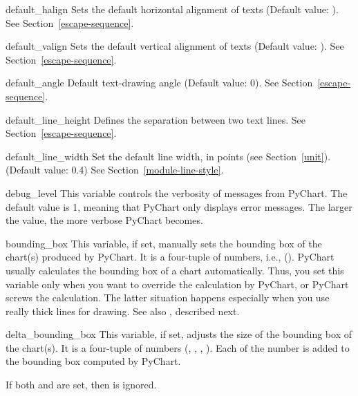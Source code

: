 \documentclass{howto}
\newcommand{\pychart}{PyChart}
\newcommand{\xref}[1]{See Section~\ref{#1}}
\newcommand{\pxref}[1]{see Section~\ref{#1}}
\begin{document}
\begin{datadesc}{default_halign}
Sets the default horizontal alignment of texts (Default value: ).
\xref{escape-sequence}.
\end{datadesc}

\begin{datadesc}{default_valign}
Sets the default vertical alignment of texts (Default value: ).
\xref{escape-sequence}.
\end{datadesc}

\begin{datadesc}{default_angle}
Default text-drawing angle (Default value: 0).
\xref{escape-sequence}.
\end{datadesc}

\begin{datadesc}{default_line_height}
Defines the separation between two text lines.
\xref{escape-sequence}.
\end{datadesc}

\begin{datadesc}{default_line_width}
Set the default line width, in points (\pxref{unit}). (Default value: 0.4)
\xref{module-line-style}.
\end{datadesc}

\begin{datadesc}{debug_level}
This variable controls the verbosity of messages from \pychart{}. The
default value is 1, meaning that \pychart{} only displays error
messages. The larger the value, the more verbose \pychart{} becomes.
\end{datadesc}

\begin{datadesc}{bounding_box}
This variable, if set, manually sets the bounding box of the
chart(s) produced by \pychart{}. It is a four-tuple of numbers, i.e.,
().
\pychart{} usually calculates
the bounding box of a chart
automatically. Thus, you set this variable only
when you want to override the
calculation by \pychart{}, or \pychart{} screws the calculation.  The latter
situation happens especially when you use really thick lines for
drawing. See also , described next.
\end{datadesc}

\begin{datadesc}{delta_bounding_box}
This variable, if set, adjusts the size of the bounding box of
the chart(s).
It is a four-tuple of numbers (, , , ). Each of the number is added to the bounding box computed by
\pychart{}.

If both  and  are
set, then  is ignored.
\end{datadesc}
\end{document}
